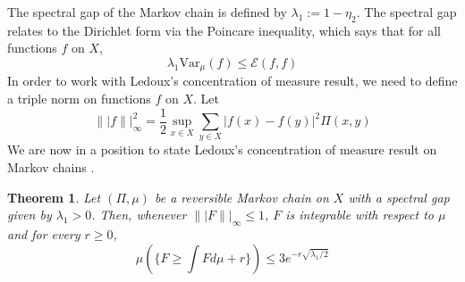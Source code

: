 \documentclass[12pt]{report}
\newtheorem{thm}{Theorem}[section]
\theoremstyle{definition}
\begin{document}
The spectral gap of the Markov chain is defined by $\lambda_1:=1-\eta_2$.  The spectral gap relates to the Dirichlet form via the Poincare inequality, which says that for all functions $f$ on $X$,
$$
\lambda_1 \mathrm{Var}_{\mu}(f)\leq \mathcal{E}(f,f)
$$
In order to work with Ledoux's concentration of measure result, we need to define a triple norm on functions $f$ on $X$.  Let 
$$
\||f\||_{\infty}^2=\frac{1}{2}\sup_{x\in X}\sum_{y\in X}|f(x)-f(y)|^2\Pi(x,y)
$$
We are now in a position to state Ledoux's concentration of measure result on Markov chains \cite{LedouxCOM}.
\begin{thm}
Let $(\Pi,\mu)$ be a reversible Markov chain on $X$ with a spectral gap given by $\lambda_1>0$.  Then, whenever $\||F\||_{\infty}\leq 1$, $F$ is integrable with respect to $\mu$ and for every $r\geq 0$, 
$$
\mu\left (\{F\geq\int Fd\mu+r\}\right)\leq 3e^{-r\sqrt{\lambda_1/2}}$$
\end{thm}
\end{document}
